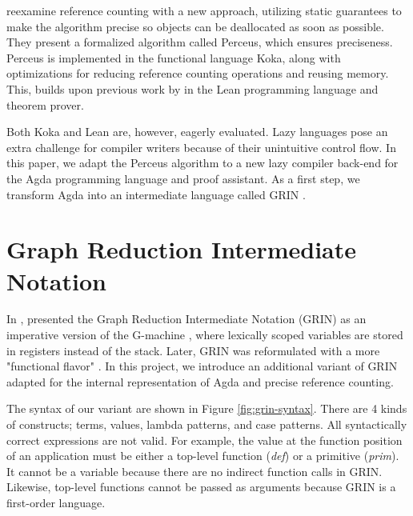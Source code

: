 \documentclass[10pt, twocolumn]{article}
\begin{document}
\citet{reinking2021} reexamine reference counting with a new approach, utilizing static guarantees to make the algorithm precise so objects can be deallocated as soon as possible.
They present a formalized algorithm called Perceus, which ensures preciseness. 
Perceus is implemented in the functional language Koka, along with optimizations for reducing reference counting operations and reusing memory.
This, builds upon previous work by \citet{ullrich2021} in the Lean programming language and theorem prover. 

Both Koka and Lean are, however, eagerly evaluated. 
Lazy languages pose an extra challenge for compiler writers because of their unintuitive control flow. 
In this paper, we adapt the Perceus algorithm to a new lazy compiler back-end for the Agda programming language and proof assistant.
As a first step, we transform Agda into an intermediate language called GRIN \citep{johnsson1991}.

\section{Graph Reduction Intermediate Notation}
In \citeyear{johnsson1991}, \citeauthor{johnsson1991} presented the Graph Reduction Intermediate Notation (GRIN) as an imperative version of the G-machine \citep{johnsson1984}, where lexically scoped variables are stored in registers instead of the stack. 
Later, GRIN was reformulated with a more "functional flavor" \citep{boquist1995}.
In this project, we introduce an additional variant of GRIN adapted for the internal representation of Agda and precise reference counting. 

The syntax of our variant are shown in Figure \ref{fig:grin-syntax}.
There are 4 kinds of constructs; terms, values, lambda patterns, and case patterns.
All syntactically correct expressions are not valid. For example, the value at the function position of an application must be either a top-level function (\emph{def}) or a primitive (\emph{prim}). It cannot be a variable because
there are no indirect function calls in GRIN. Likewise, top-level functions cannot be passed 
as arguments because GRIN is a first-order language.
\end{document}
